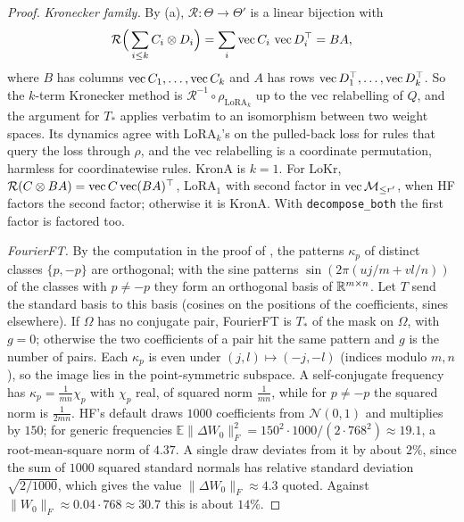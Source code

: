\begin{proof}
\emph{Kronecker family.} By (a), $\mathcal R:\Theta\to\Theta'$ is a linear bijection with
\begin{equation*}
  \mathcal R\Big(\sum_{i\le k}C_i\otimes D_i\Big)=\sum_i\operatorname{vec} C_i\,\operatorname{vec} D_i^{\top}=BA,
\end{equation*}
where $B$ has columns $\operatorname{vec} C_1,\dots,\operatorname{vec} C_k$ and $A$ has rows $\operatorname{vec} D_1^{\top},\dots,\operatorname{vec} D_k^{\top}$. So the $k$-term Kronecker method is $\mathcal R^{-1}\circ\rho_{\mathrm{LoRA}_k}$ up to the
vec relabelling of $Q$, and the argument for $T_*$ applies verbatim to an isomorphism between two weight spaces. Its
dynamics agree with LoRA$_k$'s on the pulled-back loss for rules that query the loss through $\rho$, and the vec relabelling is a
coordinate permutation, harmless for coordinatewise rules. KronA is $k=1$. For LoKr,
$\mathcal R(C\otimes BA)=\operatorname{vec} C\operatorname{vec}(BA)^{\top}$, LoRA$_1$ with second factor in $\operatorname{vec}\mathcal{M}_{\le r'}$, when HF factors the second
factor; otherwise it is KronA. With \texttt{decompose\_both} the first factor is factored too.

\emph{FourierFT.} By the computation in the proof of , the patterns $\kappa_p$ of distinct
classes $\{p,-p\}$ are orthogonal; with the sine patterns $\sin(2\pi(uj/m+vl/n))$ of the classes with $p\ne-p$ they form an
orthogonal basis of $\mathbb{R}^{m\times n}$. Let $T$ send the standard basis to this basis (cosines on the positions of the
coefficients, sines elsewhere). If $\Omega$ has no conjugate pair, FourierFT is $T_*$ of the mask on $\Omega$, with $g=0$;
otherwise the two coefficients of a pair hit the same pattern and $g$ is the number of pairs. Each $\kappa_p$ is even under
$(j,l)\mapsto(-j,-l)$ (indices modulo $m,n$), so the image lies in the point-symmetric subspace. A self-conjugate
frequency has $\kappa_p=\tfrac1{mn}\chi_p$ with $\chi_p$ real, of squared norm $\tfrac1{mn}$, while for $p\ne-p$ the squared
norm is $\tfrac1{2mn}$. HF's default draws $1000$ coefficients from $\mathcal N(0,1)$ and multiplies by $150$; for generic
frequencies $\mathbb E\lVert\Delta W_0\rVert_F^2=150^2\cdot1000/(2\cdot768^2)\approx19.1$, a root-mean-square norm of
$4.37$. A single draw deviates from it by about $2\%$, since the sum of $1000$ squared standard normals has relative
standard deviation $\sqrt{2/1000}$, which gives the value $\lVert\Delta W_0\rVert_F\approx4.3$ quoted. Against
$\lVert W_0\rVert_F\approx0.04\cdot768\approx30.7$ this is about $14\%$.


\end{proof}
